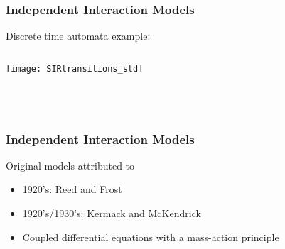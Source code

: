 \begin{frame}
  \frametitle{Independent Interaction Models}

  \begin{block}{Discrete time automata example:}
    \medskip
    \begin{columns}
      \begin{column}{0.4\textwidth}
        \texttt{[image: SIRtransitions\_std]}
      \end{column}
      \begin{column}{0.5\textwidth}

        \bigskip
        \\
        \\
        \\
      \end{column}
    \end{columns}
  \end{block}

\end{frame}


\begin{frame}
  \frametitle{Independent Interaction Models}

  \begin{block}{Original models attributed to}
    \begin{itemize}
    \item<2-> 1920's: Reed and Frost
    \item<3-> 1920's/1930's: Kermack and McKendrick\cite{kermack1927a,kermack1932a,kermack1933a}
    \item<4-> Coupled differential equations with a mass-action principle
    \end{itemize}
  \end{block}

\end{frame}

